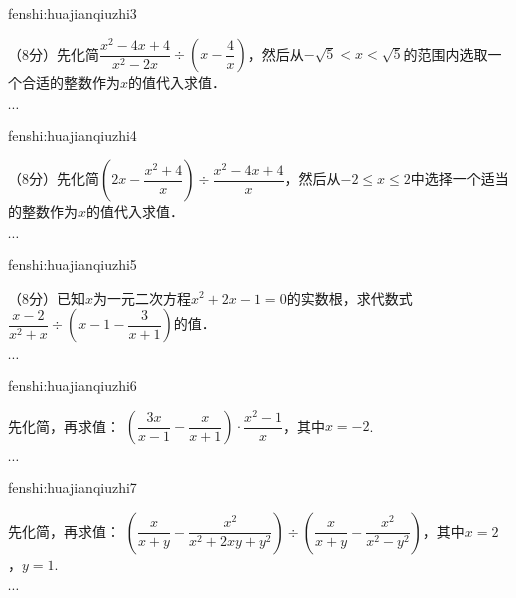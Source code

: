 \begin{defproblem}{fenshi:huajianqiuzhi3}%
\begin{onlyproblem}%
（8分）先化简$\dfrac{x^2-4x+4}{x^2-2x}\div \left(x-\dfrac{4}{x}\right)$，然后从$-\sqrt 5 <x<\sqrt 5 $的范围内选取一个合适的整数作为$x$的值代入求值．
\end{onlyproblem}%
\begin{onlysolution}%
$\cdots$
\end{onlysolution}%
\end{defproblem}

\begin{defproblem}{fenshi:huajianqiuzhi4}%
\begin{onlyproblem}%
（8分）先化简$\left(2x-\dfrac{x^2+4}{x}\right)\div \dfrac{x^2-4x+4}{x}$，然后从$-2\leqslant x\leqslant 2$中选择一个适当的整数作为$x$的值代入求值．
\end{onlyproblem}%
\begin{onlysolution}%
$\cdots$
\end{onlysolution}%
\end{defproblem}

\begin{defproblem}{fenshi:huajianqiuzhi5}%
\begin{onlyproblem}%
（8分）已知$x$为一元二次方程$x^{2}+2x-1=0$的实数根，求代数式$\dfrac{x-2}{x^2+x}\div \left(x-1-\dfrac{3}{x+1}\right)$的值．
\end{onlyproblem}%
\begin{onlysolution}%
$\cdots$
\end{onlysolution}%
\end{defproblem}

\begin{defproblem}{fenshi:huajianqiuzhi6}%
\begin{onlyproblem}%
先化简，再求值：
$\left(\dfrac{3x}{x-1}-\dfrac{x}{x+1}\right)\cdot \dfrac{x^2-1}{x}$，其中$x=-2$.
\end{onlyproblem}%
\begin{onlysolution}%
$\cdots$
\end{onlysolution}%
\end{defproblem}

\begin{defproblem}{fenshi:huajianqiuzhi7}%
\begin{onlyproblem}%
先化简，再求值：
$\left(\dfrac{x}{x+y}-\dfrac{x^2}{x^2+2xy+y^2}\right)\div \left(\dfrac{x}{x+y}-\dfrac{x^2}{x^2-y^2}\right)$，其中$x=2$，$y=1$.
\end{onlyproblem}%
\begin{onlysolution}%
$\cdots$
\end{onlysolution}%
\end{defproblem}


